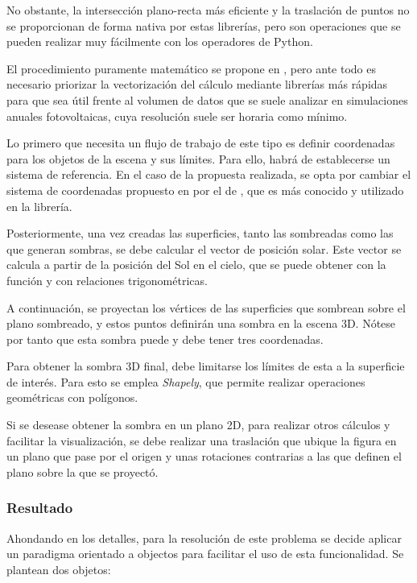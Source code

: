 No obstante, la intersección plano-recta más eficiente y la traslación de puntos no se proporcionan de forma nativa por estas librerías, pero son operaciones que se pueden realizar muy fácilmente con los operadores de Python.

El procedimiento puramente matemático se propone en \cite{Zainali_Ma_Lu_Stridh_Avelin_Amaducci_Colauzzi_Campana_2023}, pero ante todo es necesario priorizar la vectorización del cálculo mediante librerías más rápidas para que sea útil frente al volumen de datos que se suele analizar en simulaciones anuales fotovoltaicas, cuya resolución suele ser horaria como mínimo.

Lo primero que necesita un flujo de trabajo de este tipo es definir coordenadas para los objetos de la escena y sus límites. Para ello, habrá de establecerse un sistema de referencia. En el caso de la propuesta realizada, se opta por cambiar el sistema de coordenadas propuesto en \cite{Zainali_Ma_Lu_Stridh_Avelin_Amaducci_Colauzzi_Campana_2023} por el de \cite{Anderson_Mikofski_2020}, que es más conocido y utilizado en la librería.

Posteriormente, una vez creadas las superficies, tanto las sombreadas como las que generan sombras, se debe calcular el vector de posición solar. Este vector se calcula a partir de la posición del Sol en el cielo, que se puede obtener con la función  y con relaciones trigonométricas.

A continuación, se proyectan los vértices de las superficies que sombrean sobre el plano sombreado, y estos puntos definirán una sombra en la escena 3D. Nótese por tanto que esta sombra puede y debe tener tres coordenadas.

Para obtener la sombra 3D final, debe limitarse los límites de esta a la superficie de interés. Para esto se emplea \textit{Shapely}, que permite realizar operaciones geométricas con polígonos.

Si se desease obtener la sombra en un plano 2D, para realizar otros cálculos y facilitar la visualización, se debe realizar una traslación que ubique la figura en un plano que pase por el origen y unas rotaciones contrarias a las que definen el plano sobre la que se proyectó.

\subsubsection{Resultado}

Ahondando en los detalles, para la resolución de este problema se decide aplicar un paradigma orientado a objectos para facilitar el uso de esta funcionalidad. Se plantean dos objetos:

